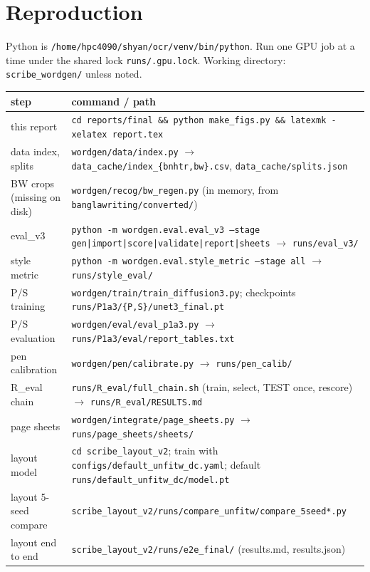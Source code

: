\documentclass[10.5pt,a4paper]{article}
\newcommand{\fp}[1]{\nolinkurl{#1}}
\begin{document}
\appendix
\section{Reproduction}
\label{app:repro}
Python is \fp{/home/hpc4090/shyan/ocr/venv/bin/python}. Run one GPU job at a time under the shared lock
\fp{runs/.gpu.lock}. Working directory: \fp{scribe_wordgen/} unless noted.

\begin{table}[H]
\centering
\small
\begin{tabular}{@{}p{3.4cm}p{12.2cm}@{}}
\toprule
step & command / path \\
\midrule
this report & \texttt{cd reports/final \&\& python make\_figs.py \&\& latexmk -xelatex report.tex} \\
data index, splits & \fp{wordgen/data/index.py} $\to$ \fp{data_cache/index_{bnhtr,bw}.csv}, \fp{data_cache/splits.json} \\
BW crops (missing on disk) & \fp{wordgen/recog/bw_regen.py} (in memory, from \fp{banglawriting/converted/}) \\
eval\_v3 & \texttt{python -m wordgen.eval.eval\_v3 --stage gen|import|score|validate|report|sheets} $\to$ \fp{runs/eval_v3/} \\
style metric & \texttt{python -m wordgen.eval.style\_metric --stage all} $\to$ \fp{runs/style_eval/} \\
P/S training & \fp{wordgen/train/train_diffusion3.py}; checkpoints \fp{runs/P1a3/{P,S}/unet3_final.pt} \\
P/S evaluation & \fp{wordgen/eval/eval_p1a3.py} $\to$ \fp{runs/P1a3/eval/report_tables.txt} \\
pen calibration & \fp{wordgen/pen/calibrate.py} $\to$ \fp{runs/pen_calib/} \\
R\_eval chain & \fp{runs/R_eval/full_chain.sh} (train, select, TEST once, rescore) $\to$ \fp{runs/R_eval/RESULTS.md} \\
page sheets & \fp{wordgen/integrate/page_sheets.py} $\to$ \fp{runs/page_sheets/sheets/} \\
layout model & \texttt{cd scribe\_layout\_v2}; train with \fp{configs/default_unfitw_dc.yaml}; default \fp{runs/default_unfitw_dc/model.pt} \\
layout 5-seed compare & \fp{scribe_layout_v2/runs/compare_unfitw/compare_5seed*.py} \\
layout end to end & \fp{scribe_layout_v2/runs/e2e_final/} (results.md, results.json) \\
\bottomrule
\end{tabular}
\end{table}
\end{document}
